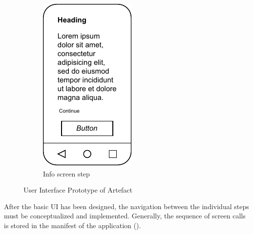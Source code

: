 \begin{figure}[htbp]
\begin{subfigure}[b]{0.3\textwidth}
        \includegraphics[width=\textwidth]{content/05_design_and_dev_artefacts/ActivityInfoScreen.drawio.pdf}
        \caption{Info screen step}
        \label{subfig:InfoScreen}
    \end{subfigure}
       \caption{User Interface Prototype of Artefact}
       \label{fig:uiPrototypeArtefact}
\end{figure}

After the basic UI has been designed, the navigation between the individual steps must be conceptualized and implemented. Generally, the sequence of screen calls is stored in the manifest of the application (\cite{Google.2023}).


